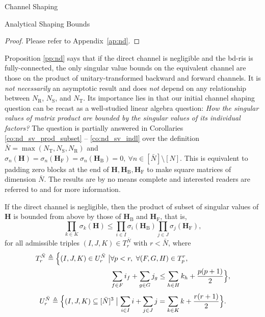 \documentclass[journal]{IEEEtran}
\begin{document}
\begin{section}{Channel Shaping}
\begin{subsection}{Analytical Shaping Bounds}
		\begin{proof}
			Please refer to Appendix~\ref{ap:nd}.
		\end{proof}

		Proposition \ref{pp:nd} says that if the direct channel is negligible and the \gls{bd}-\gls{ris} is fully-connected, the only singular value bounds on the equivalent channel are those on the product of unitary-transformed backward and forward channels.
		It is \emph{not necessarily} an asymptotic result and does \emph{not} depend on any relationship between $N_\mathrm{R}$, $N_\mathrm{S}$, and $N_\mathrm{T}$.
		Its importance lies in that our initial channel shaping question can be recast as a well-studied linear algebra question: \emph{How the singular values of matrix product are bounded by the singular values of its individual factors?}
		The question is partially answered in Corollaries \ref{co:nd_sv_prod_subset} -- \ref{co:nd_sv_indl} over the definition $\bar{N} = \max(N_\mathrm{T},N_\mathrm{S},N_\mathrm{R})$ and $\sigma_n(\mathbf{H})=\sigma_n(\mathbf{H}_\mathrm{F})=\sigma_n(\mathbf{H}_\mathrm{B})=0, \ \forall n \in [\bar{N}] \setminus [N]$.
		This is equivalent to padding zero blocks at the end of $\mathbf{H}, \mathbf{H}_\mathrm{B}, \mathbf{H}_\mathrm{F}$ to make square matrices of dimension $\bar{N}$.
		The results are by no means complete and interested readers are referred to \cite[Chapter 16, 24]{Hogben2013} and \cite[Chapter 3]{Horn1994} for more information.


		\begin{corollary}
			\label{co:nd_sv_prod_subset}
			If the direct channel is negligible,
			then the product of subset of singular values of $\mathbf{H}$ is bounded from above by those of $\mathbf{H}_\mathrm{B}$ and $\mathbf{H}_\mathrm{F}$, that is,
			\begin{equation}
				\label{iq:horn}
				\prod_{k \in {K}} \sigma_k(\mathbf{H}) \le \prod_{i \in {I}} \sigma_i(\mathbf{H}_\mathrm{B}) \prod_{j \in {J}} \sigma_j(\mathbf{H}_\mathrm{F}),
			\end{equation}
			for all admissible triples $(I, J, K) \in T_r^{\bar{N}}$ with $r < \bar{N}$, where
			\begin{equation*}
				\begin{split}
					T_r^{\bar{N}} \triangleq \Bigl\{(I, J, K) \in U_r^{\bar{N}} \bigm\vert & \forall p < r, \ \forall (F, G, H) \in T_p^r,                                              \\
																							& \sum_{f \in F} i_f + \sum_{g \in G} j_g \le \sum_{h \in H} k_h + \frac{p(p+1)}{2} \Bigr\},
				\end{split}
			\end{equation*}
			\begin{equation*}
				U_r^{\bar{N}} \triangleq \Bigl\{(I, J, K) \subseteq [\bar{N}]^3 \bigm\vert \sum_{i \in I} i + \sum_{j \in J} j = \sum_{k \in K} k + \frac{r(r+1)}{2}\Bigr\}.
			\end{equation*}
		\end{corollary}


\end{subsection}
\end{section}
\end{document}
